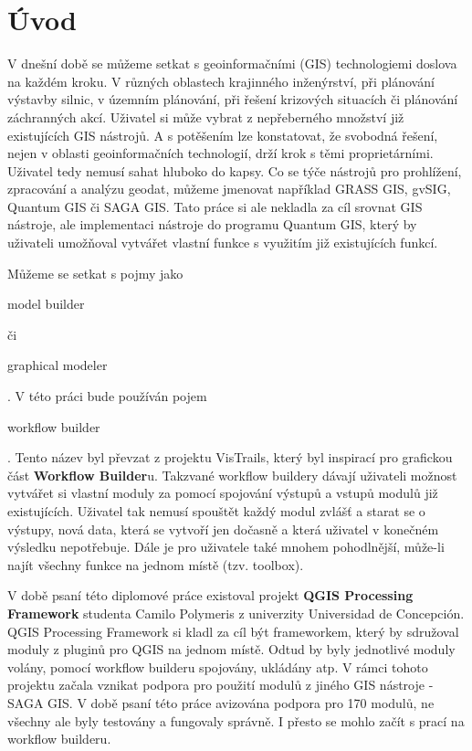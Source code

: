 \chapter*{Úvod}

V dnešní době se můžeme setkat s  geoinformačními (GIS) technologiemi doslova na každém kroku. V různých oblastech krajinného inženýrství, při plánování výstavby silnic, v územním plánování, při řešení krizových situacích či plánování záchranných akcí. Uživatel si může vybrat z nepřeberného množství již existujících GIS nástrojů. A s potěšením lze konstatovat, že svobodná řešení, nejen v oblasti geoinformačních technologií, drží krok s těmi proprietárními. Uživatel tedy nemusí sahat hluboko do kapsy. Co se týče nástrojů pro prohlížení, zpracování a analýzu  geodat, můžeme jmenovat například GRASS GIS, gvSIG, Quantum GIS či SAGA GIS. Tato práce si ale nekladla za cíl srovnat GIS nástroje, ale implementaci nástroje do programu Quantum GIS, který by uživateli umožňoval vytvářet vlastní funkce s využitím již existujících funkcí.

Můžeme se setkat s pojmy jako \begin{scriptsize}model builder\end{scriptsize} či \begin{scriptsize}graphical modeler\end{scriptsize}. V této práci bude používán pojem \begin{scriptsize}workflow builder\end{scriptsize}. Tento název byl převzat z projektu  VisTrails, který byl inspirací pro grafickou část \textbf{Workflow Builder}u. Takzvané workflow buildery dávají uživateli možnost vytvářet si vlastní moduly za pomocí spojování výstupů a vstupů modulů již existujících. Uživatel tak nemusí spouštět každý modul zvlášť a starat se o výstupy, nová data, která se vytvoří jen dočasně a která uživatel v konečném výsledku nepotřebuje. Dále je pro uživatele také mnohem pohodlnější, může-li najít všechny funkce na jednom místě (tzv. toolbox).%

V době psaní této diplomové práce existoval projekt  \textbf{QGIS Processing Framework} studenta Camilo Polymeris z univerzity Universidad de Concepción. QGIS Processing Framework si kladl za cíl být frameworkem, který by sdružoval moduly z pluginů pro QGIS na jednom místě. Odtud by byly jednotlivé moduly volány, pomocí workflow builderu spojovány, ukládány atp. V rámci tohoto projektu začala vznikat podpora pro použití modulů z jiného GIS nástroje -  SAGA GIS. V době psaní této práce avizována podpora pro 170 modulů, ne všechny ale byly testovány a fungovaly správně. I přesto se mohlo začít s prací na workflow builderu.


